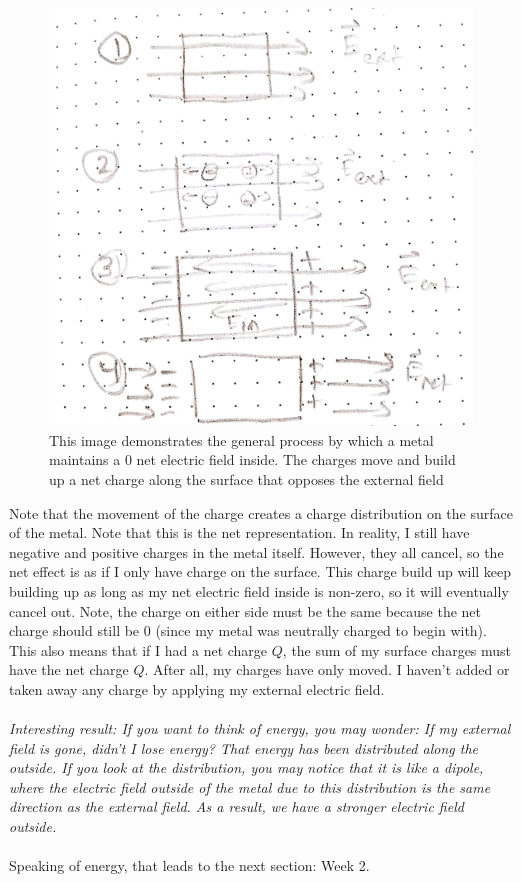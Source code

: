 \documentclass{article}
\begin{document}
\pagebreak
\begin{figure}[ht]
\center
\includegraphics[width=.3\textwidth]{images/Week1pic5.jpg}
\caption{This image demonstrates the general process by which a metal maintains a 0 net electric field inside. The charges move and build up a net charge along the surface that opposes the external field}
\end{figure}

Note that the movement of the charge creates a charge distribution on the surface of the metal. Note that this is the net representation. In reality, I still have negative and positive charges in the metal itself. However, they all cancel, so the net effect is as if I only have charge on the surface. This charge build up will keep building up as long as my net electric field inside is non-zero, so it will eventually cancel out. Note, the charge on either side must be the same because the net charge should still be $0$ (since my metal was neutrally charged to begin with). This also means that if I had a net charge $Q$, the sum of my surface charges must have the net charge $Q$. After all, my charges have only moved. I haven't added or taken away any charge by applying my external electric field. 
\\
\\
\textit{Interesting result: If you want to think of energy, you may wonder: If my external field is gone, didn't I lose energy? That energy has been distributed along the outside. If you look at the distribution, you may notice that it is like a dipole, where the electric field outside of the metal due to this distribution is the same direction as the external field. As a result, we have a stronger electric field outside.}
\\
\\
Speaking of energy, that leads to the next section: Week 2.
\pagebreak
\end{document}
